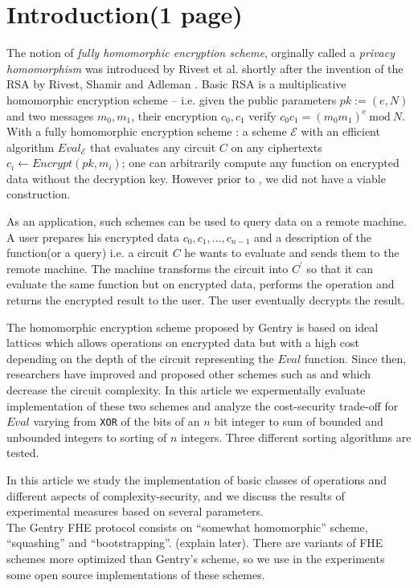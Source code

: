 \documentclass{acm_proc_article-sp}
\begin{document}

\section{Introduction(1 page)}

The notion of \textit{fully homomorphic encryption scheme}, orginally called a \textit{privacy homomorphism} was introduced by Rivest et al. \cite{rivest78} shortly after the invention of the RSA by Rivest, Shamir and Adleman \cite{Rivest78amethod}.  Basic RSA is a multiplicative homomorphic encryption scheme -- i.e. given the public parameters $pk:=(e, N)$ and two messages $m_0, m_1$, their encryption $c_0, c_1$ verify $c_0c_1=(m_0m_1)^e \ \textrm {mod}\ N$. With a fully homomorphic encryption scheme : a scheme $\mathcal{E}$ with an efficient algorithm $Eval_\mathcal{E}$ that evaluates any circuit $C$ on any ciphertexts $c_i \leftarrow Encrypt(pk, m_i)$; one can arbitrarily compute any function on encrypted data without the decryption key. However prior to \cite{homenc}, we did not have a viable construction.

As an application, such schemes can be used to query data on a remote machine. A user prepares his encrypted data $c_0, c_1, \ldots, c_{n-1}$  and a description of the function(or a query) i.e. a circuit $C$ he wants to evaluate and sends them to the remote machine. The machine transforms the circuit into $C^{'}$ so that it can evaluate the same function but on encrypted data, performs the operation and returns the encrypted result to the user. The user eventually decrypts the result.  

The homomorphic encryption scheme proposed by Gentry \cite{homenc} is based on ideal lattices which allows operations on encrypted data
but with a high cost depending on the depth of the circuit representing the $Eval$ function. Since then, researchers have improved and proposed other schemes such as \cite{cryptoeprint:2009:571} and \cite{cryptoeprint:2011:277} which decrease the circuit complexity. In this article we expermentally evaluate implementation of these two schemes and analyze the cost-security trade-off for $Eval$ varying from \texttt{XOR} of the bits of an $n$ bit integer to sum of bounded and unbounded integers to sorting of $n$ integers. Three different sorting algorithms are tested.   

In this article we study the implementation of basic classes of operations and different aspects of 
complexity-security, and we discuss the results of experimental measures based on several parameters.\\
The Gentry FHE protocol consists on ``somewhat homomorphic'' scheme, ``squashing'' and ``bootstrapping''. (explain later). 
There are variants of FHE schemes more optimized than Gentry's scheme, so we use in the experiments some open source implementations of these schemes.
\end{document}
